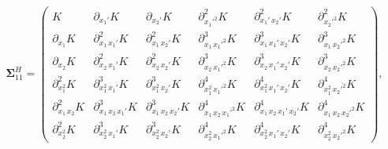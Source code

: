 \documentclass[12pt]{article}
\begin{document}
\begin{equation}
	\label{eqn:hegp_S11_2d}
	\boldsymbol{\Sigma}^{H}_{11} =
	\begin{pmatrix}
		K &
		\partial_{x_1'} K &
		\partial_{x_2'} K &
		\partial^2_{x_1'^2} K &
		\partial^2_{x_1'\,x_2'} K &
		\partial^2_{x_2'^2} K \\[8pt]
		\partial_{x_1} K &
		\partial^2_{x_1\,x_1'} K &
		\partial^2_{x_1\,x_2'} K &
		\partial^3_{x_1\,x_1'^2} K &
		\partial^3_{x_1\,x_1'\,x_2'} K &
		\partial^3_{x_1\,x_2'^2} K \\[8pt]
		\partial_{x_2} K &
		\partial^2_{x_2\,x_1'} K &
		\partial^2_{x_2\,x_2'} K &
		\partial^3_{x_2\,x_1'^2} K &
		\partial^3_{x_2\,x_1'\,x_2'} K &
		\partial^3_{x_2\,x_2'^2} K \\[8pt]
		\partial^2_{x_1^2} K &
		\partial^3_{x_1^2\,x_1'} K &
		\partial^3_{x_1^2\,x_2'} K &
		\partial^4_{x_1^2\,x_1'^2} K &
		\partial^4_{x_1^2\,x_1'\,x_2'} K &
		\partial^4_{x_1^2\,x_2'^2} K \\[8pt]
		\partial^2_{x_1\,x_2} K &
		\partial^3_{x_1\,x_2\,x_1'} K &
		\partial^3_{x_1\,x_2\,x_2'} K &
		\partial^4_{x_1\,x_2\,x_1'^2} K &
		\partial^4_{x_1\,x_2\,x_1'\,x_2'} K &
		\partial^4_{x_1\,x_2\,x_2'^2} K \\[8pt]
		\partial^2_{x_2^2} K &
		\partial^3_{x_2^2\,x_1'} K &
		\partial^3_{x_2^2\,x_2'} K &
		\partial^4_{x_2^2\,x_1'^2} K &
		\partial^4_{x_2^2\,x_1'\,x_2'} K &
		\partial^4_{x_2^2\,x_2'^2} K
	\end{pmatrix},
\end{equation}
\end{document}
